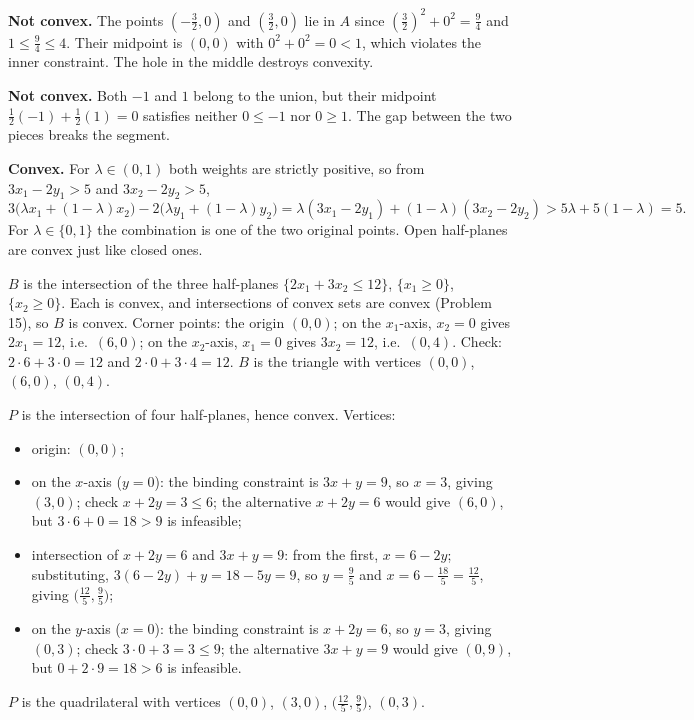 \begin{solutions}
  \item \textbf{Not convex.} The points $(-\tfrac32,0)$ and $(\tfrac32,0)$
        lie in $A$ since $(\tfrac32)^{2}+0^{2}=\tfrac94$ and $1\le
        \tfrac94\le 4$. Their midpoint is $(0,0)$ with
        $0^{2}+0^{2}=0<1$, which violates the inner constraint. The hole in
        the middle destroys convexity.

  \item \textbf{Not convex.} Both $-1$ and $1$ belong to the union, but
        their midpoint $\tfrac12(-1)+\tfrac12(1)=0$ satisfies neither
        $0\le -1$ nor $0\ge 1$. The gap between the two pieces breaks the
        segment.

  \item \textbf{Convex.} For $\lambda\in(0,1)$ both weights are strictly
        positive, so from $3x_{1}-2y_{1}>5$ and $3x_{2}-2y_{2}>5$,
        \[
          3\bigl(\lambda x_{1}+(1-\lambda)x_{2}\bigr)
          -2\bigl(\lambda y_{1}+(1-\lambda)y_{2}\bigr)
          =\lambda(3x_{1}-2y_{1})+(1-\lambda)(3x_{2}-2y_{2})
          >5\lambda+5(1-\lambda)=5 .
        \]
        For $\lambda\in\{0,1\}$ the combination is one of the two original
        points. Open half-planes are convex just like closed ones.

  \item $B$ is the intersection of the three half-planes
        $\{2x_{1}+3x_{2}\le 12\}$, $\{x_{1}\ge 0\}$, $\{x_{2}\ge 0\}$. Each
        is convex, and intersections of convex sets are convex (Problem
        15), so $B$ is convex. Corner points: the origin $(0,0)$; on the
        $x_{1}$-axis, $x_{2}=0$ gives $2x_{1}=12$, i.e.\ $(6,0)$; on the
        $x_{2}$-axis, $x_{1}=0$ gives $3x_{2}=12$, i.e.\ $(0,4)$.
        Check: $2\cdot 6+3\cdot 0=12$ and $2\cdot 0+3\cdot 4=12$. $B$ is
        the triangle with vertices $(0,0)$, $(6,0)$, $(0,4)$.

  \item $P$ is the intersection of four half-planes, hence convex.
        Vertices:
        \begin{itemize}[leftmargin=1.6em,itemsep=0.3ex]
          \item origin: $(0,0)$;
          \item on the $x$-axis ($y=0$): the binding constraint is
                $3x+y=9$, so $x=3$, giving $(3,0)$; check $x+2y=3\le 6$;
                the alternative $x+2y=6$ would give $(6,0)$, but
                $3\cdot 6+0=18>9$ is infeasible;
          \item intersection of $x+2y=6$ and $3x+y=9$: from the first,
                $x=6-2y$; substituting, $3(6-2y)+y=18-5y=9$, so
                $y=\tfrac95$ and $x=6-\tfrac{18}{5}=\tfrac{12}{5}$, giving
                $\bigl(\tfrac{12}{5},\tfrac95\bigr)$;
          \item on the $y$-axis ($x=0$): the binding constraint is
                $x+2y=6$, so $y=3$, giving $(0,3)$; check $3\cdot 0+3=3\le
                9$; the alternative $3x+y=9$ would give $(0,9)$, but
                $0+2\cdot 9=18>6$ is infeasible.
        \end{itemize}
        $P$ is the quadrilateral with vertices $(0,0)$, $(3,0)$,
        $\bigl(\tfrac{12}{5},\tfrac95\bigr)$, $(0,3)$.


\end{solutions}
